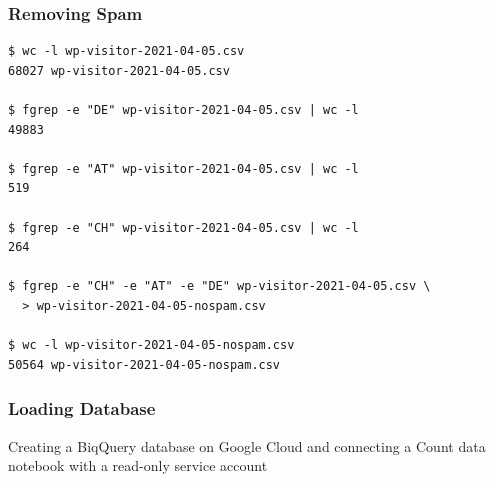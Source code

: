 \subsubsection{Removing Spam}

\begin{lstlisting}[caption=Removing Spam, frame=single, basicstyle=\ttfamily]
$ wc -l wp-visitor-2021-04-05.csv
68027 wp-visitor-2021-04-05.csv

$ fgrep -e "DE" wp-visitor-2021-04-05.csv | wc -l
49883

$ fgrep -e "AT" wp-visitor-2021-04-05.csv | wc -l
519

$ fgrep -e "CH" wp-visitor-2021-04-05.csv | wc -l
264

$ fgrep -e "CH" -e "AT" -e "DE" wp-visitor-2021-04-05.csv \
  > wp-visitor-2021-04-05-nospam.csv

$ wc -l wp-visitor-2021-04-05-nospam.csv 
50564 wp-visitor-2021-04-05-nospam.csv

\end{lstlisting}

\subsubsection{Loading Database}

Creating a BiqQuery database on Google Cloud and connecting a Count data notebook with a read-only service account
